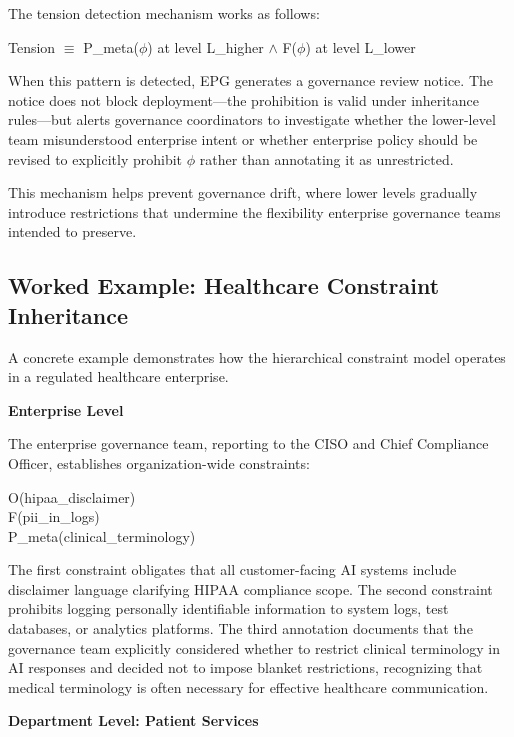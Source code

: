 The tension detection mechanism works as follows:

\begin{claddisp}
Tension $\equiv$ P\_meta($\phi$) at level L\_higher $\wedge$ F($\phi$) at level L\_lower
\end{claddisp}


When this pattern is detected, EPG generates a governance review notice. The notice does not block deployment---the prohibition is valid under inheritance rules---but alerts governance coordinators to investigate whether the lower-level team misunderstood enterprise intent or whether enterprise policy should be revised to explicitly prohibit $\phi$ rather than annotating it as unrestricted.

This mechanism helps prevent governance drift, where lower levels gradually introduce restrictions that undermine the flexibility enterprise governance teams intended to preserve.

\subsection{Worked Example: Healthcare Constraint Inheritance}


A concrete example demonstrates how the hierarchical constraint model operates in a regulated healthcare enterprise.

\textbf{Enterprise Level}

The enterprise governance team, reporting to the CISO and Chief Compliance Officer, establishes organization-wide constraints:

\begin{claddisp}
O(hipaa\_disclaimer)\\
F(pii\_in\_logs)\\
P\_meta(clinical\_terminology)
\end{claddisp}


The first constraint obligates that all customer-facing AI systems include disclaimer language clarifying HIPAA compliance scope. The second constraint prohibits logging personally identifiable information to system logs, test databases, or analytics platforms. The third annotation documents that the governance team explicitly considered whether to restrict clinical terminology in AI responses and decided not to impose blanket restrictions, recognizing that medical terminology is often necessary for effective healthcare communication.

\textbf{Department Level: Patient Services}

